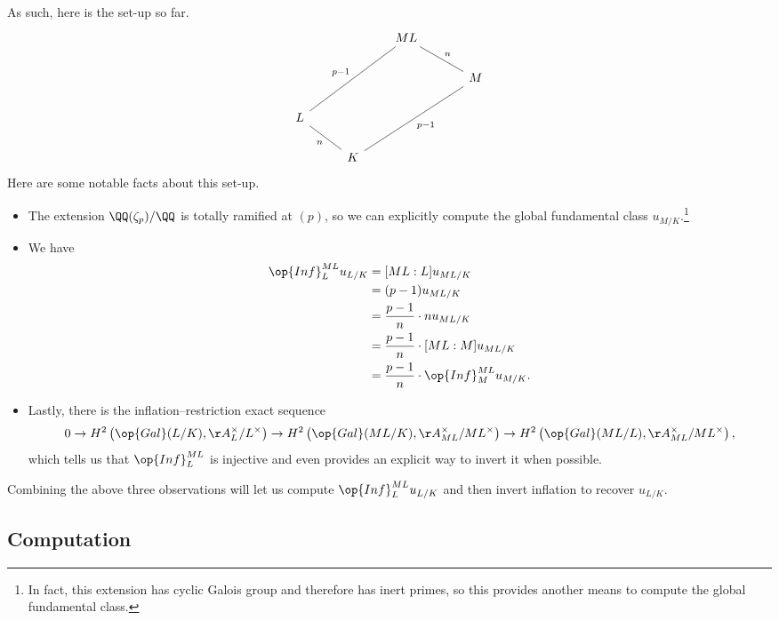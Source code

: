 As such, here is the set-up so far.
\[\begin{tikzcd}[column sep={1.5cm,between origins}]
	&& {ML} \\
	&&& {M} \\
	L \\
	& K
	\arrow["n", no head, from=4-2, to=3-1]
	\arrow["{p-1}"', no head, from=4-2, to=2-4]
	\arrow["n"', no head, from=2-4, to=1-3]
	\arrow["{p-1}", no head, from=3-1, to=1-3]
\end{tikzcd}\]
Here are some notable facts about this set-up.
\begin{itemize}
	\item The extension $\QQ(\zeta_p)/\QQ$ is totally ramified at $(p)$, so we can explicitly compute the global fundamental class $u_{M/K}$.\footnote{In fact, this extension has cyclic Galois group and therefore has inert primes, so this provides another means to compute the global fundamental class.}
	\item We have
	\begin{align*}
		\op{Inf}^{ML}_Lu_{L/K} &= [ML:L]u_{ML/K} \\
		&= (p-1)u_{ML/K} \\
		&= \frac{p-1}n\cdot nu_{ML/K} \\
		&= \frac{p-1}n\cdot[ML:M]u_{ML/K} \\
		&= \frac{p-1}n\cdot\op{Inf}^{ML}_Mu_{M/K}.
	\end{align*}
	\item Lastly, there is the inflation--restriction exact sequence
	\[0\to H^2\left(\op{Gal}(L/K),\AA_L^\times/L^\times\right)\to H^2\left(\op{Gal}(ML/K),\AA_{ML}^\times/ML^\times\right)\to H^2\left(\op{Gal}(ML/L),\AA_{ML}^\times/ML^\times\right),\]
	which tells us that $\op{Inf}^{ML}_L$ is injective and even provides an explicit way to invert it when possible.
\end{itemize}
Combining the above three observations will let us compute $\op{Inf}^{ML}_Lu_{L/K}$ and then invert inflation to recover $u_{L/K}$.

\subsection{Computation}